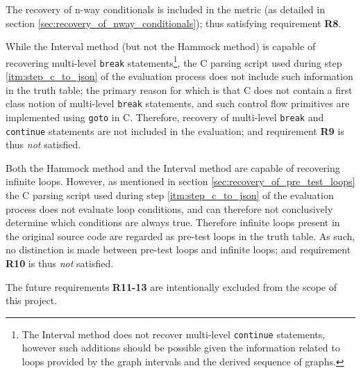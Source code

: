 The recovery of n-way conditionals is included in the metric (as detailed in section \ref{sec:recovery_of_nway_conditionals}); thus satisfying requirement \textbf{R8}.

While the Interval method (but not the Hammock method) is capable of recovering multi-level \texttt{break} statements\footnote{The Interval method does not recover multi-level \texttt{continue} statements, however such additions should be possible given the information related to loops provided by the graph intervals and the derived sequence of graphs.}, the C parsing script used during step \ref{itm:step_c_to_json} of the evaluation process does not include such information in the truth table; the primary reason for which is that C does not contain a first class notion of multi-level \texttt{break} statements, and such control flow primitives are implemented using \texttt{goto} in C. Therefore, recovery of multi-level \texttt{break} and \texttt{continue} statements are not included in the evaluation; and requirement \textbf{R9} is thus \textit{not} satisfied.

Both the Hammock method and the Interval method are capable of recovering infinite loops. However, as mentioned in section \ref{sec:recovery_of_pre_test_loops} the C parsing script used during step \ref{itm:step_c_to_json} of the evaluation process does not evaluate loop conditions, and can therefore not conclusively determine which conditions are always true. Therefore infinite loops present in the original source code are regarded as pre-test loops in the truth table. As such, no distinction is made between pre-test loops and infinite loops; and requirement \textbf{R10} is thus \textit{not} satisfied.

The future requirements \textbf{R11-13} are intentionally excluded from the scope of this project.

